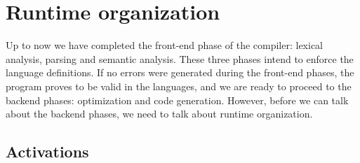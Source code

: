 \ifx\PREAMBLE\undefined


\fi
\chapter{Runtime organization}
Up to now we have completed the front-end phase of the compiler: lexical analysis, parsing and semantic analysis. These three phases intend to enforce the language definitions. If no errors were generated during the front-end phases, the program proves to be valid in the languages, and we are ready to proceed to the backend phases: optimization and code generation. However, before we can talk about the backend phases, we need to talk about runtime organization.


\section{Activations}

\ifx\PREAMBLE\undefined

\fi